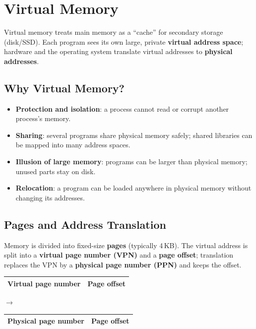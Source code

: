 \chapter{Virtual Memory}

Virtual memory treats main memory as a ``cache'' for secondary storage
(disk/SSD). Each program sees its own large, private \textbf{virtual address
space}; hardware and the operating system translate virtual addresses to
\textbf{physical addresses}.

\section{Why Virtual Memory?}

\begin{itemize}
  \item \textbf{Protection and isolation}: a process cannot read or corrupt
    another process's memory.
  \item \textbf{Sharing}: several programs share physical memory safely;
    shared libraries can be mapped into many address spaces.
  \item \textbf{Illusion of large memory}: programs can be larger than
    physical memory; unused parts stay on disk.
  \item \textbf{Relocation}: a program can be loaded anywhere in physical
    memory without changing its addresses.
\end{itemize}

\section{Pages and Address Translation}

Memory is divided into fixed-size \textbf{pages} (typically 4\,KB). The
virtual address is split into a \textbf{virtual page number (VPN)} and a
\textbf{page offset}; translation replaces the VPN by a \textbf{physical
page number (PPN)} and keeps the offset.

\begin{center}
\begin{tabular}{|c|c|}
\hline
Virtual page number & Page offset \\
\hline
\end{tabular}
\quad$\longrightarrow$\quad
\begin{tabular}{|c|c|}
\hline
Physical page number & Page offset \\
\hline
\end{tabular}
\end{center}

